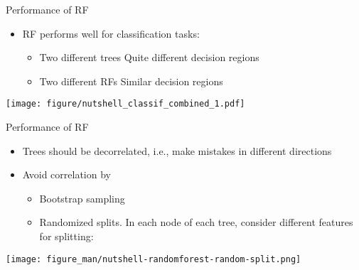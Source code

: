 \documentclass[11pt,compress,t,notes=noshow, xcolor=table]{beamer}
\begin{document}
\begin{vbframe}{Performance of RF}

    \begin{itemize}
        \item \small RF performs well for classification tasks:
        \begin{itemize}
            \item \small Two different trees \textrightarrow Quite different decision regions
            \item \small Two different RFs \textrightarrow Similar decision regions
        \end{itemize}
    \end{itemize}
\begin{center}
 \texttt{[image: figure/nutshell\_classif\_combined\_1.pdf]}
\end{center}




\end{vbframe}

\begin{vbframe}{Performance of RF}
\begin{itemize} 
\item \small Trees should be decorrelated, i.e., make mistakes in different directions
\item \small Avoid correlation by
    \begin{itemize}
        \item \small Bootstrap sampling 
        \item \small Randomized splits. In each node of each tree, consider different features for splitting:
    \end{itemize}
\end{itemize}

\vspace{0.5cm}
\begin{center}
  \texttt{[image: figure\_man/nutshell-randomforest-random-split.png]}
\end{center}




\end{vbframe}

\end{document}
